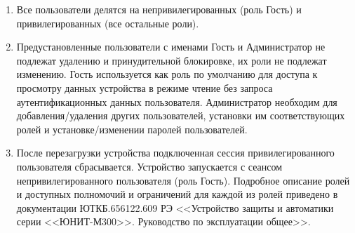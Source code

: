 \begin{enumerate}
\begin{enumerate}
\item Все пользователи делятся на непривилегированных (роль Гость) и привилегированных (все остальные роли).

\item
Предустановленные пользователи с именами Гость и Администратор не подлежат удалению и принудительной блокировке, их роли не подлежат изменению. Гость используется как роль по умолчанию для доступа к просмотру данных устройства в режиме чтение без запроса аутентификационных данных пользователя. Администратор необходим для добавления/удаления других пользователей, установки им соответствующих ролей и установке/изменении паролей пользователей.
\item
После перезагрузки устройства подключенная сессия привилегированного пользователя сбрасывается. Устройство запускается с сеансом непривилегированного пользователя (роль Гость).
Подробное описание ролей и доступных полномочий и ограничений для каждой из ролей приведено в документации ЮТКБ.656122.609 РЭ <<Устройство защиты и автоматики серии <<ЮНИТ-М300>>. Руководство по эксплуатации общее>>.


\end{enumerate}
\end{enumerate}
